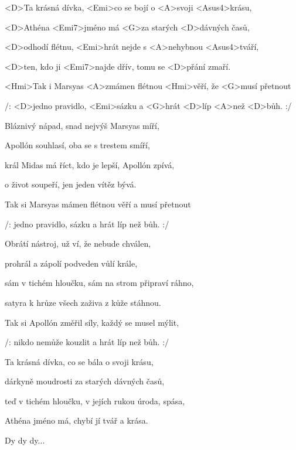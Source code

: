 

\zs
<D>Ta krásná dívka, <Emi>co se bojí o <A>svoji <Asus4>krásu,

<D>Athéna <Emi7>jméno má <G>za starých <D>dávných časů,

<D>odhodí flétnu, <Emi>hrát nejde s <A>nehybnou <Asus4>tváří,

<D>ten, kdo ji <Emi7>najde dřív, {tomu} se <D>přání zmaří.
\ks

\zr
<Hmi>Tak i Marsyas <A>zmámen flétnou <Hmi>věří, že <G>musí přetnout

/: <D>jedno pravidlo, <Emi>sázku a <G>hrát <D>líp <A>než <D>bůh. :/
\kr

\zs
Bláznivý nápad, snad nejvýš Marsyas míří,

Apollón souhlasí, oba se s trestem smíří,

král Midas má říct, kdo je lepší, Apollón zpívá,

o život soupeří, jen jeden vítěz bývá.
\ks

\zr
Tak si Marsyas mámen flétnou věří a musí přetnout

/: jedno pravidlo, sázku a hrát líp než bůh. :/
\kr

\zs
Obrátí nástroj, už ví, že nebude chválen,

prohrál a zápolí podveden vůlí krále,

sám v tichém hloučku, sám na strom připraví ráhno,

satyra k hrůze všech zaživa z kůže stáhnou.
\ks

\zr
Tak si Apollón změřil síly, každý se musel mýlit,

/: nikdo nemůže kouzlit a hrát líp než bůh. :/
\kr

\zs
Ta krásná dívka, co se bála o svoji krásu,

dárkyně moudrosti za starých dávných časů,

teď v tichém hloučku, v jejích rukou úroda, spása,

Athéna jméno má, chybí jí tvář a krása.
\ks

\zr
Dy dy dy...
\kr

\kp
